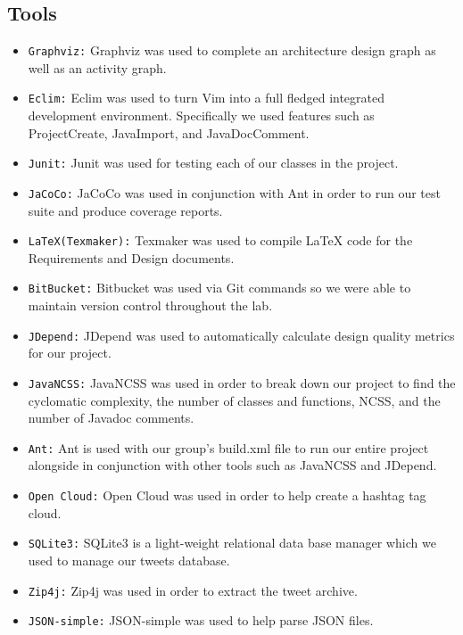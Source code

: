 \documentclass[a4paper, 12pt]{article}
\begin{document}
\subsection*{Tools}
\begin{itemize}
\item \texttt{Graphviz:} Graphviz was used to complete an architecture design graph as well as an activity graph.
\item \texttt{Eclim:} Eclim was used to turn Vim into a full fledged integrated development environment. Specifically we used features such as ProjectCreate, JavaImport, and JavaDocComment.
\item \texttt{Junit:} Junit was used for testing each of our classes in the project.
\item \texttt{JaCoCo:} JaCoCo was used in conjunction with Ant in order to run our test suite and produce coverage reports.
\item \texttt{LaTeX(Texmaker):} Texmaker was used to compile LaTeX code for the Requirements and Design documents.
\item \texttt{BitBucket:} Bitbucket was used via Git commands so we were able to maintain version control throughout the lab. 
\item \texttt{JDepend:} JDepend was used to automatically calculate design quality metrics for our project.
\item \texttt{JavaNCSS:} JavaNCSS was used in order to break down our project to find the cyclomatic complexity, the number of classes and functions, NCSS, and the number of Javadoc comments. 
\item \texttt{Ant:} Ant is used with our group’s build.xml file to run our entire project alongside in conjunction with other tools such as JavaNCSS and JDepend.
\item \texttt{Open Cloud:} Open Cloud was used in order to help create a hashtag tag cloud.
\item \texttt{SQLite3:} SQLite3 is a light-weight relational data base manager which we used to manage our tweets database.
\item \texttt{Zip4j:} Zip4j was used in order to extract the tweet archive.
\item \texttt{JSON-simple:} JSON-simple was used to help parse JSON files.
\end{itemize}
\end{document}
